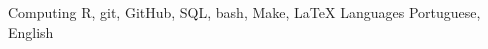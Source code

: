\begin{cvskills}
  \cvskill
    {Computing}
    {R, git, GitHub, SQL, bash, Make, LaTeX}
  \cvskill
    {Languages}
    {Portuguese, English}
\end{cvskills}
